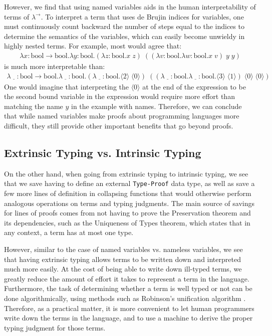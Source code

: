 \documentclass[12pt, letterpaper]{article}
\begin{document}
However, we find that using named variables aids in the human interpretability of terms of $\lambda^{\to}$. To interpret a term that uses de Brujin indices for variables, one must continuously count backward the number of steps equal to the indices to determine the semantics of the variables, which can easily become unwieldy in highly nested terms. For example, most would agree that:
\begin{align*}
\lambda x : \text{bool} \to \text{bool}. \lambda y : \text{bool}. (\lambda z : \text{bool}. x\;z)\;((\lambda v : \text{bool}.\lambda w : \text{bool}.x\;v) \;y \;y)
\end{align*}
is much more interpretable than:
\begin{align*}
\lambda \underline{\;\;\;} : \text{bool} \to \text{bool}. \lambda \underline{\;\;\;} : \text{bool}. (\lambda \underline{\;\;\;} : \text{bool}. \langle 2 \rangle\;\langle 0 \rangle)\;((\lambda \underline{\;\;\;} : \text{bool}.\lambda \underline{\;\;\;} : \text{bool}.\langle 3 \rangle\;\langle 1 \rangle) \;\langle 0 \rangle \;\langle 0 \rangle)
\end{align*}
One would imagine that interpreting the $\langle 0 \rangle$ at the end of the expression to be the second bound variable in the expression would require more effort than matching the name $y$ in the example with names. Therefore, we can conclude that while named variables make proofs about programming languages more difficult, they still provide other important benefits that go beyond proofs.

\subsection{Extrinsic Typing vs. Intrinsic Typing}
On the other hand, when going from extrinsic typing to intrinsic typing, we see that we save having to define an external \texttt{Type-Proof} data type, as well as save a few more lines of definition in collapsing functions that would otherwise perform analogous operations on terms and typing judgments. The main source of savings for lines of proofs comes from not having to prove the Preservation theorem and its dependencies, such as the Uniqueness of Types theorem, which states that in any context, a term has at most one type. 

However, similar to the case of named variables vs. nameless variables, we see that having extrinsic typing allows terms to be written down and interpreted much more easily. At the cost of being able to write down ill-typed terms, we greatly reduce the amount of effort it takes to represent a term in the language. Furthermore, the task of determining whether a term is well typed or not can be done algorithmically, using methods such as Robinson's unification algorithm \cite{robinson}. Therefore, as a practical matter, it is more convenient to let human programmers write down the terms in the language, and to use a machine to derive the proper typing judgment for those terms. 
\end{document}
